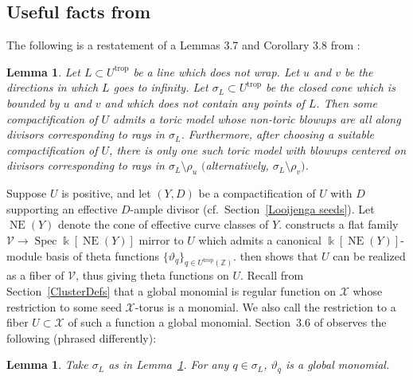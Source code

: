 \documentclass[10pt,a4paper]{amsart}
\numberwithin{equation}{section}
\numberwithin{figure}{section}
\numberwithin{table}{section}
\DeclareMathOperator{\Spec}{Spec}
\DeclareMathOperator{\NE}{NE}
\DeclareMathOperator{\trop}{trop}
\let\bb=\mathbb
\let\rar=\rightarrow
\let\s=\mathcal
\newcommand {\kk} {\Bbbk}
\newtheorem{lem}[thm]{Lemma}
\theoremstyle{definition}
\begin{document}
\subsection{Useful facts from \cite{Man1}}\label{Man}
The following is a restatement of a Lemmas 3.7 and Corollary 3.8 from \cite{Man1}:

\begin{lem}\label{model}
Let $L\subset U^{\trop}$ be a line which does not wrap. Let $u$ and $v$ be the directions in which $L$ goes to infinity. Let $\sigma_L\subset U^{\trop}$ be the closed cone which is bounded by $u$ and $v$ and which does not contain any points of $L$. Then some compactification of $U$ admits a toric model whose non-toric blowups are all along divisors corresponding to rays in $\sigma_L$. Furthermore, after choosing a suitable compactification of $U$, there is only one such toric model with blowups centered on divisors corresponding to rays in $\sigma_L \setminus \rho_u$ $($alternatively, $\sigma_L \setminus \rho_v)$.
\end{lem}

Suppose $U$ is positive, and let $(Y,D)$ be a compactification of $U$ with $D$ supporting an effective $D$-ample divisor (cf.\ Section~\ref{Looijenga seeds}). Let $\NE(Y)$ denote the cone of effective curve classes of $Y$. \cite{GHK1} constructs a flat family $\s{V}\rar \Spec \kk[\NE(Y)]$ mirror to $U$ which admits a canonical $\kk[\NE(Y)]$-module basis of theta functions $\{\vartheta_q\}_{q\in U^{\trop}(\bb{Z})}$. \cite{GHK2} then shows that $U$ can be realized as a fiber of $\s{V}$, thus giving theta functions on $U$. Recall from Section~\ref{ClusterDefs} that a global monomial is regular function on $\s{X}$ whose restriction to some seed $\s{X}$-torus is a monomial. We also call the restriction to a fiber $U\subset \s{X}$ of such a function a global monomial. Section~3.6 of \cite{Man1} observes the following (phrased differently):

\begin{lem}\label{GlobalMonomial}Take $\sigma_L$ as in Lemma~{\rm \ref{model}}. For any $q\in \sigma_L$, $\vartheta_q$ is a global monomial.
\end{lem}
\end{document}
